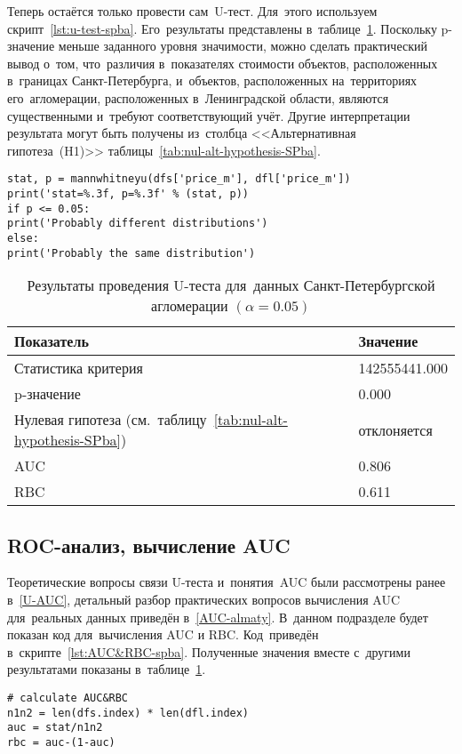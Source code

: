 \documentclass[]{scrreprt}
\begin{document}
Теперь остаётся только провести сам~U-тест. Для~этого используем скрипт~\ref{lst:u-test-spba}. Его~результаты представлены в~таблице~\ref{tab:u-test-py-result}. Поскольку p-значение меньше заданного уровня значимости, можно сделать практический вывод о~том, что~различия в~показателях стоимости объектов, расположенных в~границах Санкт-Петербурга, и~объектов, расположенных на~территориях его~агломерации, расположенных в~Ленинградской области, являются существенными и~требуют соответствующий учёт. Другие интерпретации результата могут быть получены из~столбца <<Альтернативная гипотеза~(H1)>> таблицы~\ref{tab:nul-alt-hypothesis-SPba}.
%
\begin{lstlisting}[float, caption = Проведение теста Манна"--~Уитни-Уилкоксона для~данных удельных цен предложения квартир в~агломерации Санкт-Петербурга, firstnumber=1, label= lst:u-test-spba]
stat, p = mannwhitneyu(dfs['price_m'], dfl['price_m'])
print('stat=%.3f, p=%.3f' % (stat, p))
if p <= 0.05:
print('Probably different distributions')
else:
print('Probably the same distribution')
\end{lstlisting}  
%
\begin{table}[ht]
	\caption{Результаты проведения U-теста для~данных Санкт-Петербургской агломерации $({\textstyle \alpha=0.05})$}\label{tab:u-test-py-result}
	\centering
	\begin{tabular}{ll}
		\hline
	Показатель&Значение\\
		\hline
	Статистика критерия&142555441.000\\
		\hline
	p-значение&0.000\\
		\hline
	Нулевая гипотеза (см.~таблицу~\ref{tab:nul-alt-hypothesis-SPba})&отклоняется\\
		\hline
	AUC&0.806\\
	\hline
	RBC&0.611\\
	\hline
	\end{tabular}
\end{table}

\subsection{ROC-анализ, вычисление AUC}
Теоретические вопросы связи U-теста и~понятия~AUC были рассмотрены ранее в~\ref{U-AUC}, детальный разбор практических вопросов вычисления AUC для~реальных данных приведён в~\ref{AUC-almaty}. В~данном подразделе будет показан код для~вычисления AUC и RBC. Код~приведён в~скрипте~\ref{lst:AUC&RBC-spba}. Полученные значения вместе с~другими результатами показаны в~таблице~\ref{tab:u-test-py-result}.
%
\begin{lstlisting}[float, caption = Вычисление AUC и~RBC для~данных Санкт-Петербургской агломерации, firstnumber=1, label= lst:AUC&RBC-spba]
# calculate AUC&RBC
n1n2 = len(dfs.index) * len(dfl.index)
auc = stat/n1n2
rbc = auc-(1-auc)
\end{lstlisting}  
%
\clearpage
\end{document}
